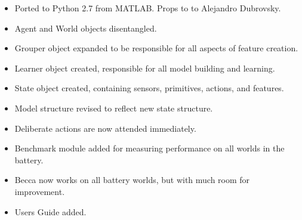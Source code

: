 \begin{itemize}
\item Ported to Python 2.7 from MATLAB. Props to to Alejandro Dubrovsky.
\item Agent and World objects disentangled.
\item Grouper object expanded to be responsible for all aspects of feature creation.
\item Learner object created, responsible for all model building and learning.
\item State object created, containing sensors, primitives, actions, and features.
\item Model structure revised to reflect new state structure.
\item Deliberate actions are now attended immediately.
\item Benchmark module added for measuring performance on all worlds in the battery.
\item Becca now works on all battery worlds, but with much room for improvement.
\item Users Guide added. 
\end{itemize}

